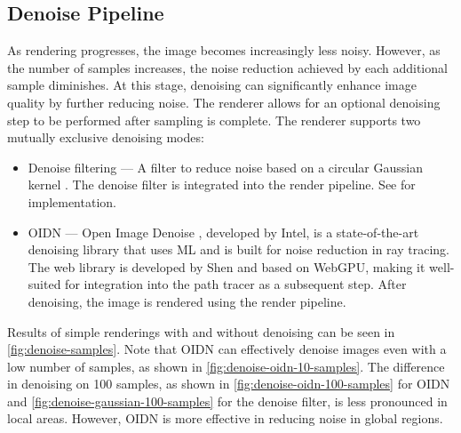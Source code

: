 \subsection*{Denoise Pipeline}

As rendering progresses, the image becomes increasingly less noisy. However, as the number of samples increases, the noise reduction achieved by each additional sample diminishes. At this stage, denoising can significantly enhance image quality by further reducing noise. The renderer allows for an optional denoising step to be performed after sampling is complete. The renderer supports two mutually exclusive denoising modes:

\begin{itemize}
    \item{Denoise filtering} — A filter to reduce noise based on a circular Gaussian kernel \cite{conventionalGaussianDenoise}. The denoise filter is integrated into the render pipeline. See  for implementation.
    \item{\gls{OIDN}} — Open Image Denoise \cite{openImageDenoise}, developed by Intel, is a state-of-the-art denoising library that uses \gls{ML} and is built for noise reduction in ray tracing. The web library is developed by Shen \cite{oidnWeb} and based on \gls{WebGPU}, making it well-suited for integration into the path tracer as a subsequent step. After denoising, the image is rendered using the render pipeline.
\end{itemize}

Results of simple renderings with and without denoising can be seen in \autoref{fig:denoise-samples}. Note that \gls{OIDN} can effectively denoise images even with a low number of samples, as shown in \autoref{fig:denoise-oidn-10-samples}. The difference in denoising on 100 samples, as shown in \autoref{fig:denoise-oidn-100-samples} for \gls{OIDN} and \autoref{fig:denoise-gaussian-100-samples} for the denoise filter, is less pronounced in local areas. However, \gls{OIDN} is more effective in reducing noise in global regions.

